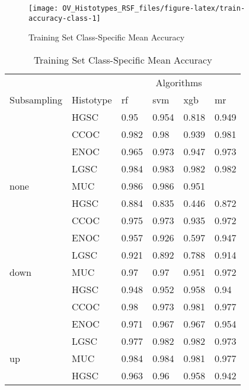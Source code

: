 \documentclass[
]{report}
\begin{document}
\begin{figure}[H]

{\centering \texttt{[image: OV\_Histotypes\_RSF\_files/figure-latex/train-accuracy-class-1]} 

}

\caption{Training Set Class-Specific Mean Accuracy}\label{fig:train-accuracy-class}
\end{figure}

\begin{table}

\caption{\label{tab:train-accuracy-class-table}Training Set Class-Specific Mean Accuracy}
\centering
\begin{tabular}[t]{l|l|l|l|l|l}
\hline
\multicolumn{2}{c|}{ } & \multicolumn{4}{c}{Algorithms} \\
\cline{3-6}
Subsampling & Histotype & rf & svm & xgb & mr\\
\hline
 & HGSC & 0.95 & 0.954 & 0.818 & 0.949\\
\cline{2-6}
 & CCOC & 0.982 & 0.98 & 0.939 & 0.981\\
\cline{2-6}
 & ENOC & 0.965 & 0.973 & 0.947 & 0.973\\
\cline{2-6}
 & LGSC & 0.984 & 0.983 & 0.982 & 0.982\\
\cline{2-6}
\multirow{-5}{*}{\raggedright\arraybackslash none} & MUC & 0.986 & 0.986 & 0.951 & \cellcolor[HTML]{90ee90}{0.988}\\
\cline{1-6}
 & HGSC & 0.884 & 0.835 & 0.446 & 0.872\\
\cline{2-6}
 & CCOC & 0.975 & 0.973 & 0.935 & 0.972\\
\cline{2-6}
 & ENOC & 0.957 & 0.926 & 0.597 & 0.947\\
\cline{2-6}
 & LGSC & 0.921 & 0.892 & 0.788 & 0.914\\
\cline{2-6}
\multirow{-5}{*}{\raggedright\arraybackslash down} & MUC & 0.97 & 0.97 & 0.951 & 0.972\\
\cline{1-6}
 & HGSC & 0.948 & 0.952 & 0.958 & 0.94\\
\cline{2-6}
 & CCOC & 0.98 & 0.973 & 0.981 & 0.977\\
\cline{2-6}
 & ENOC & 0.971 & 0.967 & 0.967 & 0.954\\
\cline{2-6}
 & LGSC & 0.977 & 0.982 & 0.982 & 0.973\\
\cline{2-6}
\multirow{-5}{*}{\raggedright\arraybackslash up} & MUC & 0.984 & 0.984 & 0.981 & 0.977\\
\cline{1-6}
 & HGSC & 0.963 & 0.96 & 0.958 & 0.942\\
\cline{2-6}

\end{tabular}
\end{table}
\end{document}
